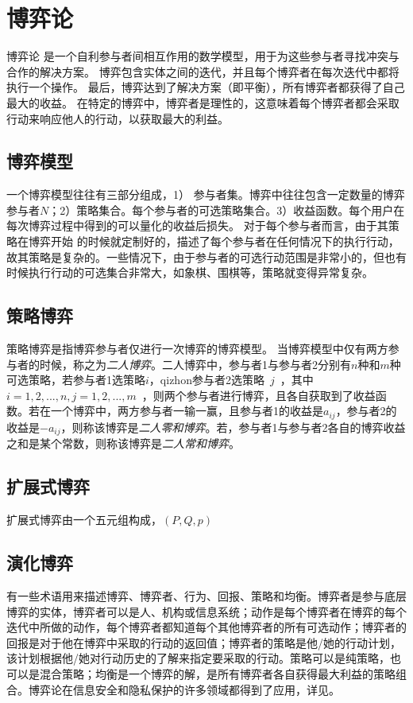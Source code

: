 \section{博弈论}
博弈论\cite{owen2001game,gibbons1992game} 是一个自利参与者间相互作用的数学模型，用于为这些参与者寻找冲突与合作的解决方案。 博弈包含实体之间的迭代，并且每个博弈者在每次迭代中都将执行一个操作。 最后，博弈达到了解决方案（即平衡），所有博弈者都获得了自己最大的收益。 在特定的博弈中，博弈者是理性的，这意味着每个博弈者都会采取行动来响应他人的行动，以获取最大的利益。


\subsection{博弈模型}

一个博弈模型往往有三部分组成，1） 参与者集。博弈中往往包含一定数量的博弈参与者$N$；2）策略集合。每个参与者的可选策略集合。3）收益函数。每个用户在每次博弈过程中得到的可以量化的收益后损失。
对于每个参与者而言，由于其策略在博弈开始 的时候就定制好的，描述了每个参与者在任何情况下的执行行动，故其策略是复杂的。一些情况下，由于参与者的可选行动范围是非常小的，但也有时候执行行动的可选集合非常大，如象棋、围棋等，策略就变得异常复杂。

\subsection{策略博弈}
策略博弈是指博弈参与者仅进行一次博弈的博弈模型。
当博弈模型中仅有两方参与者的时候，称之为\textit{二人博弈}。二人博弈中，参与者1与参与者2分别有$n$种和$m$种可选策略，若参与者1选策略$i$，qizhon参与者2选策略~$j$~，其中~$i=1,2,...,n,j=1,2,...,m$~，则两个参与者进行博弈，且各自获取到了收益函数。若在一个博弈中，两方参与者一输一赢，且参与者1的收益是$a_{ij}$，参与者2的收益是$-a_{ij}$，则称该博弈是\textit{二人零和博弈}。若，参与者1与参与者2各自的博弈收益之和是某个常数，则称该博弈是\textit{二人常和博弈}。


\subsection{扩展式博弈}
扩展式博弈由一个五元组构成，$(P,Q,p)$
\subsection{演化博弈}



有一些术语用来描述博弈、博弈者、行为、回报、策略和均衡\cite{liang2013game}。博弈者是参与底层博弈的实体，博弈者可以是人、机构或信息系统；动作是每个博弈者在博弈的每个迭代中所做的动作，每个博弈者都知道每个其他博弈者的所有可选动作；博弈者的回报是对于他在博弈中采取的行动的返回值；博弈者的策略是他/她的行动计划，该计划根据他/她对行动历史的了解来指定要采取的行动。策略可以是纯策略，也可以是混合策略；均衡是一个博弈的解，是所有博弈者各自获得最大利益的策略组合。博弈论在信息安全和隐私保护的许多领域都得到了应用，详见\cite{liang2013game}。
